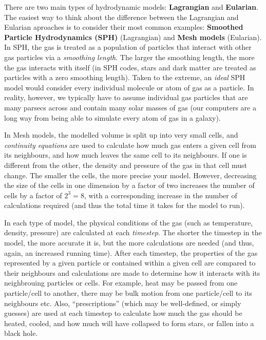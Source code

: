 \documentclass[11pt]{article}
\begin{document}
There are two main types of hydrodynamic models: {\bf Lagrangian} and
{\bf Eularian}. The easiest way to think about the difference between
the Lagrangian and Eularian aproaches is to consider their most common
examples: {\bf Smoothed Particle Hydrodynamics (SPH)} (Lagrangian) and
{\bf Mesh models} (Eularian). In SPH, the gas is treated as a
population of particles that interact with other gas particles via a
{\it smoothing length}. The larger the smoothing length, the more the
gas interacts with itself (in SPH codes, stars and dark matter are
treated as particles with a zero smoothing length). Taken to the
extreme, an {\it ideal} SPH model would consider every individual
molecule or atom of gas as a particle. In reality, however, we
typically have to assume individual gas particles that are many
parsecs across and contain many solar masses of gas (our computers are
a long way from being able to simulate every atom of gas in a galaxy).

In Mesh models, the modelled volume is split up into very small cells,
and {\it continuity equations} are used to calculate how much gas
enters a given cell from its neighbours, and how much leaves the same
cell to its neighbours. If one is different from the other, the
density and pressure of the gas in that cell must change. The
smaller the cells, the more precise your model. However, decreasing
the size of the cells in one dimension by a factor of two increases
the number of cells by a factor of $2^3=8$, with a corresponding
increase in the number of calculations required (and thus the total
time it takes for the model to run).

In each type of model, the physical conditions of the gas (such as
temperature, density, pressure) are calculated at each {\it
  timestep}. The shorter the timestep in the model, the more accurate
it is, but the more calculations are needed (and thus, again, an
increased running time). After each timestep, the properties of the
gas represented by a given particle or contained within a given cell
are compared to their neighbours and calculations are made to
determine how it interacts with its neighbrouing particles or
cells. For example, heat may be passed from one particle/cell to
another, there may be bulk motion from one particle/cell to its
neighbours etc. Also, ``prescriptions'' (which may be well-defined, or
simply guesses) are used at each timestep to calculate how much the
gas should be heated, cooled, and how much will have collapsed to form
stars, or fallen into a black hole.
\end{document}
